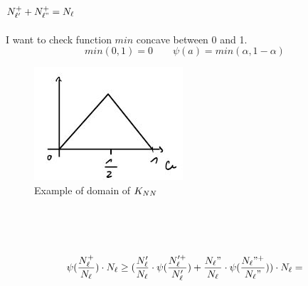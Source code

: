 \documentclass[../main.tex]{subfiles}
\begin{document}
\\\\
$N_{\ell'}^+ + N_{\ell"}^+ = N_{\ell}
$ 
\\\\
I want to check function $min$ concave between 0 and 1.\\
$$min (0,1) = 0  \qquad \psi(a) = min(\alpha, 1- \alpha) $$
\begin{figure}[h]
    \centering
    \includegraphics[width=0.4\linewidth]{../img/lez5-img5.JPG}
    \caption{Example of domain of $K_{NN}$}
\end{figure}
\\
\\\\
$$
\psi(\frac{N_{\ell}^+}{N_{\ell}}) \cdot N_{\ell} 
\geq 
(\frac{N_{\ell}'}{N_{\ell}} \cdot \psi (\frac{N_{\ell}'^+}{N_{\ell}'})
+ 
\frac{N_{\ell}"}{N_{\ell}}\cdot \psi(\frac{N_{\ell}"^+}{N_{\ell}"})) \cdot N_{\ell} =
$$
\end{document}
